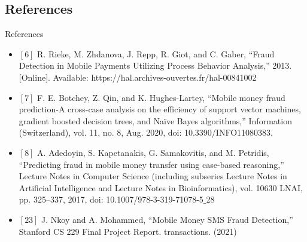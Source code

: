 \documentclass[11pt,aspectratio=169]{beamer}
\begin{document}
			\subsection{References}
			\begin{frame}
			\begin{block}{References}
				\begin{itemize}
					\small
					
					\item	$[6]$	R. Rieke, M. Zhdanova, J. Repp, R. Giot, and C. Gaber, “Fraud Detection in Mobile Payments Utilizing Process Behavior Analysis,” 2013. [Online]. Available: https://hal.archives-ouvertes.fr/hal-00841002
					
					\item 	$[7]$	F. E. Botchey, Z. Qin, and K. Hughes-Lartey, “Mobile money fraud prediction-A cross-case analysis on the efficiency of support vector machines, gradient boosted decision trees, and Naïve Bayes algorithms,” Information (Switzerland), vol. 11, no. 8, Aug. 2020, doi: 10.3390/INFO11080383.
					
					\item	$[8]$	A. Adedoyin, S. Kapetanakis, G. Samakovitis, and M. Petridis, “Predicting fraud in mobile money transfer using case-based reasoning,” Lecture Notes in Computer Science (including subseries Lecture Notes in Artificial Intelligence and Lecture Notes in Bioinformatics), vol. 10630 LNAI, pp. 325–337, 2017, doi: 10.1007/978-3-319-71078-5$\_$28
					
					\item	$[23]$	J. Nkoy and A. Mohammed, “Mobile Money SMS Fraud Detection,” Stanford CS 229 Final Project Report.
					transactions. (2021)
					
				\end{itemize}
			\end{block}
		\end{frame}
	
\end{document}
